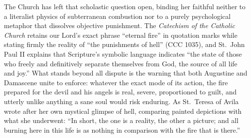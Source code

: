 The Church has left that scholastic question open, binding her faithful neither to a literalist physics of subterranean combustion nor to a purely psychological metaphor that dissolves objective punishment. The \textit{Catechism of the Catholic Church} retains our Lord's exact phrase ``eternal fire'' in quotation marks while stating firmly the reality of ``the punishments of hell'' (CCC 1035), and St.\ John Paul II explains that Scripture's symbolic language indicates ``the state of those who freely and definitively separate themselves from God, the source of all life and joy.'' What stands beyond all dispute is the warning that both Augustine and Damascene unite to enforce: whatever the exact mode of its action, the fire prepared for the devil and his angels is real, severe, proportioned to guilt, and utterly unlike anything a sane soul would risk enduring. As St.\ Teresa of Avila wrote after her own mystical glimpse of hell, comparing painted depictions with what she underwent: ``In short, the one is a reality, the other a picture; and all burning here in this life is as nothing in comparison with the fire that is there.''
